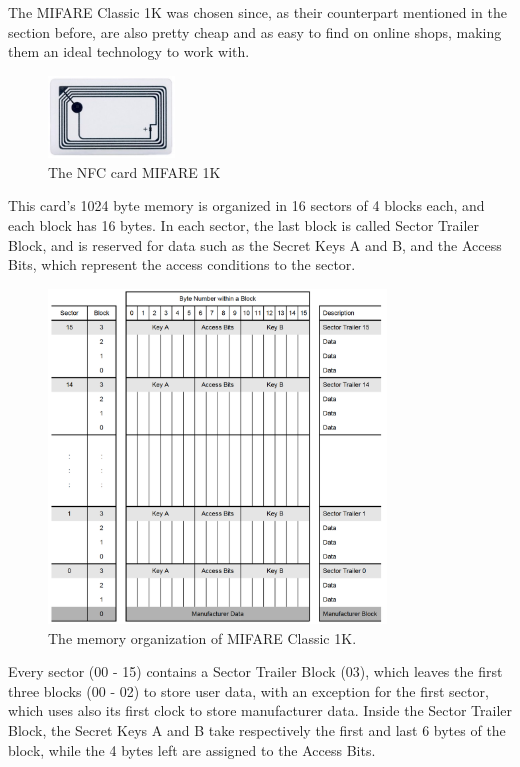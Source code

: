 \documentclass[target=bach,aauheader=,style=]{thud}
\begin{document}
The MIFARE Classic 1K \cite{mifare1k} was chosen since, as their counterpart mentioned in the section before, are also pretty cheap and as easy to find on online shops, making them an ideal technology to work with.
\newpage

\begin{figure}
	\centering
	\includegraphics[width=0.3\textwidth]{mifare1k}
	\caption{The NFC card MIFARE 1K}
	\label{fig:mifare1k}
\end{figure} 

This card's 1024 byte memory is organized in 16 sectors of 4 blocks each, and each block has 16 bytes. In each sector, the last block is called Sector Trailer Block, and is reserved for data such as the Secret Keys A and B, and the Access Bits, which represent the access conditions to the sector.

\begin{figure}[h!]
	\centering
	\includegraphics[width=0.8\textwidth]{mifare1kmemory}
	\caption{The memory organization of MIFARE Classic 1K.}
	\label{fig:mifare1kmemory}
\end{figure}

Every sector (00 - 15)  contains a Sector Trailer Block (03), which leaves the first three blocks (00 - 02) to store user data, with an exception for the first sector, which uses also its first clock to store manufacturer data.
Inside the Sector Trailer Block, the Secret Keys A and B take respectively the first and last 6 bytes of the block, while the 4 bytes left are assigned to the Access  Bits.
\end{document}

